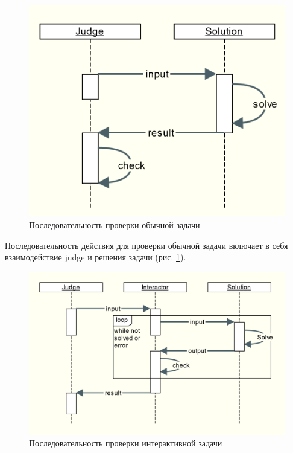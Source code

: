\documentclass{imcs}
\begin{document}
\begin{figure}[htb]
\centering
\includegraphics[width=\textwidth,keepaspectratio]{./img/normal_problem.png}
\caption{Последовательность проверки обычной задачи}
\label{normal_problem}
\end{figure}

\FloatBarrier

Последовательность действия для проверки обычной задачи включает в себя взаимодействие judge и решения задачи (рис. \ref{normal_problem}).

\FloatBarrier

\begin{figure}[htb]
\centering
\includegraphics[width=\textwidth,keepaspectratio]{./img/interactive_problem.png}
\caption{Последовательность проверки интерактивной задачи}
\label{interactive_problem}
\end{figure}
\end{document}
